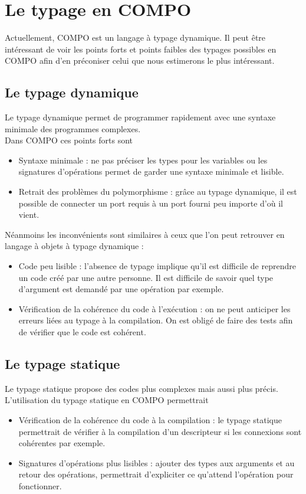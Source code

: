 \documentclass[11pt,a4paper,openany,oneside]{book}
\begin{document}
\section{Le typage en COMPO}
Actuellement, COMPO est un langage à typage dynamique. Il peut être intéressant de voir les points forts et points faibles des typages possibles en COMPO afin d'en préconiser celui que nous estimerons le plus intéressant.

\subsection{Le typage dynamique}
Le typage dynamique permet de programmer rapidement avec une syntaxe minimale des programmes complexes.\\
Dans COMPO ces points forts sont
\begin{itemize}
\item Syntaxe minimale : ne pas préciser les types pour les variables ou les signatures d'opérations permet de garder une syntaxe minimale et lisible.
\item Retrait des problèmes du polymorphisme : grâce au typage dynamique, il est possible de connecter un port requis à un port fourni peu importe d'où il vient.
\end{itemize}

Néanmoins les inconvénients sont similaires à ceux que l'on peut retrouver en langage à objets à typage dynamique : 
\begin{itemize}
\item Code peu lisible : l'absence de typage implique qu'il est difficile de reprendre un code créé par une autre personne. Il est difficile de savoir quel type d'argument est demandé par une opération par exemple.
\item Vérification de la cohérence du code à l'exécution : on ne peut anticiper les erreurs liées au typage à la compilation. On est obligé de faire des tests afin de vérifier que le code est cohérent.
\end{itemize}

\subsection{Le typage statique}
Le typage statique propose des codes plus complexes mais aussi plus précis.\\
L'utilisation du typage statique en COMPO permettrait
\begin{itemize}
\item Vérification de la cohérence du code à la compilation : le typage statique permettrait de vérifier à la compilation d'un descripteur si les connexions sont cohérentes par exemple.
\item Signatures d'opérations plus lisibles : ajouter des types aux arguments et au retour des opérations, permettrait d'expliciter ce qu'attend l'opération pour fonctionner.
\end{itemize}
\end{document}
